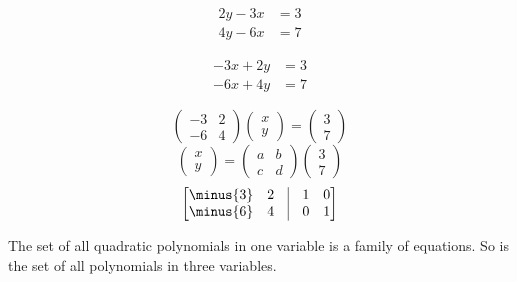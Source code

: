 \documentclass[crop=false,class=book,oneside]{standalone}                      %
\begin{document}
        \begin{align*}
            2y-3x&=3\\
            4y-6x&=7
        \end{align*}
        \par\hfill\par
        \begin{align*}
            \minus{3}x+2y&=3\\
            \minus{6}x+4y&=7
        \end{align*}
        \par\hfill\par
        \begin{equation}
            \begin{pmatrix}
                \minus{3}&2\\
                \minus{6}&4
            \end{pmatrix}
            \begin{pmatrix}
                x\\y
            \end{pmatrix}
            =
            \begin{pmatrix}
                3\\7
            \end{pmatrix}
        \end{equation}
        \begin{equation}
            \begin{pmatrix}
                x\\y
            \end{pmatrix}
            =
            \begin{pmatrix}
                a&b\\
                c&d
            \end{pmatrix}
            \begin{pmatrix}
                3\\7
            \end{pmatrix}
        \end{equation}
        \begin{equation}
            \begin{bmatrix}
                \minus{3}&2&\vline&1&0\\
                \minus{6}&4&\vline&0&1
            \end{bmatrix}
        \end{equation}
        \begin{example}
            The set of all quadratic polynomials in one variable is a family
            of equations. So is the set of all polynomials in three variables.
        \end{example}
\end{document}

